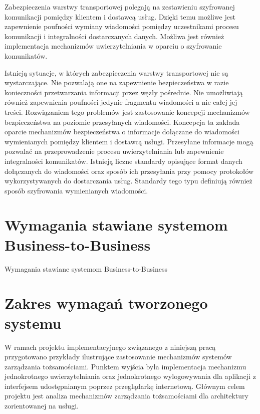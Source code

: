 		Zabezpieczenia warstwy transportowej polegają na zestawieniu szyfrowanej komunikacji pomiędzy klientem i dostawcą usług. Dzięki temu możliwe jest zapewnienie poufności wymiany wiadomości pomiędzy uczestnikami procesu komunikacji i integralności dostarczanych danych. Możliwa jest również implementacja mechanizmów uwierzytelniania w oparciu o szyfrowanie komunikatów\cite{Kolaczek09}.

		Istnieją sytuacje, w których zabezpieczenia warstwy transportowej nie są wystarczające.  Nie pozwalają one na zapewnienie bezpieczeństwa w razie konieczności przetwarzania informacji przez węzły pośrednie. Nie umożliwiają również zapewnienia poufności jedynie fragmentu wiadomości a nie całej jej treści. Rozwiązaniem tego problemów jest zastosowanie koncepcji mechanizmów bezpieczeństwa na poziomie przesyłanych wiadomości. Koncepcja ta zakłada oparcie mechanizmów bezpieczeństwa o informacje dołączane do wiadomości wymienianych pomiędzy klientem i dostawcą usługi. Przesyłane informacje mogą pozwalać na przeprowadzenie procesu uwierzytelniania lub zapewnienie integralności komunikatów. Istnieją liczne standardy opisujące format danych dołączanych do wiadomości oraz sposób ich przesyłania przy pomocy protokołów wykorzystywanych do dostarczania usług. Standardy tego typu definiują również sposób szyfrowania wymienianych wiadomości.		

\section{Wymagania stawiane systemom Business-to-Business}
\label{sec:wymaganiaB2B}

Wymagania stawiane systemom Business-to-Business


\section{Zakres wymagań tworzonego systemu}
\label{sec:zakresWymagan}

	W ramach projektu implementacyjnego  związanego z niniejszą pracą przygotowano przykłady ilustrujące zastosowanie mechanizmów systemów zarządzania tożsamościami. Punktem wyjścia była implementacja mechanizmu jednokrotnego uwierzytelniania oraz jednokrotnego wylogowywania dla aplikacji z interfejsem udostępnianym poprzez przeglądarkę internetową. Głównym celem projektu jest analiza mechanizmów zarządzania tożsamościami dla architektury zorientowanej na usługi.

